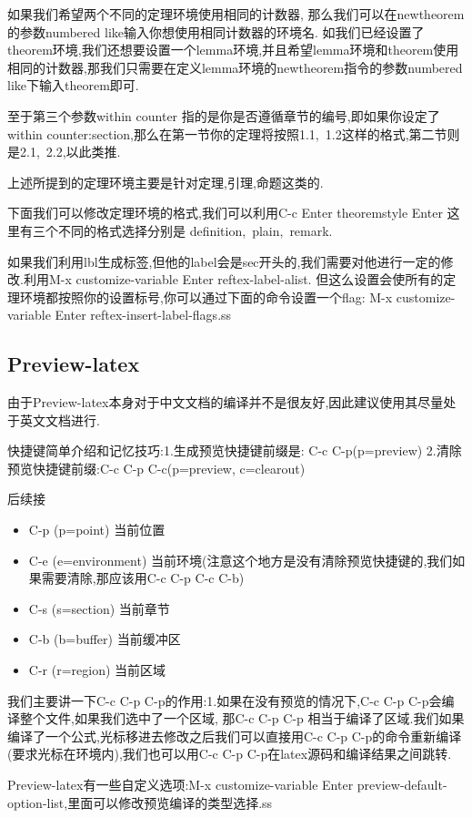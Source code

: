 \documentclass[UTF8]{ctexart}
\begin{document}
如果我们希望两个不同的定理环境使用相同的计数器, 那么我们可以在newtheorem的参数numbered like输入你想使用相同计数器的环境名. 如我们已经设置了theorem环境,我们还想要设置一个lemma环境,并且希望lemma环境和theorem使用相同的计数器,那我们只需要在定义lemma环境的newtheorem指令的参数numbered like下输入theorem即可.

至于第三个参数within counter 指的是你是否遵循章节的编号,即如果你设定了within counter:section,那么在第一节你的定理将按照1.1,\ 1.2这样的格式,第二节则是2.1,\ 2.2,以此类推.

上述所提到的定理环境主要是针对定理,引理,命题这类的.

下面我们可以修改定理环境的格式,我们可以利用C-c Enter theoremstyle Enter 这里有三个不同的格式选择分别是 definition,\ plain,\ remark.

如果我们利用lbl生成标签,但他的label会是sec开头的,我们需要对他进行一定的修改.利用M-x customize-variable Enter reftex-label-alist. 但这么设置会使所有的定理环境都按照你的设置标号,你可以通过下面的命令设置一个flag: M-x customize-variable Enter reftex-insert-label-flags.ss
\subsection{Preview-latex}
由于Preview-latex本身对于中文文档的编译并不是很友好,因此建议使用其尽量处于英文文档进行.

快捷键简单介绍和记忆技巧:1.生成预览快捷键前缀是: C-c C-p(p=preview) 2.清除预览快捷键前缀:C-c C-p C-c(p=preview, c=clearout)

后续接
\begin{itemize}
\item C-p (p=point) 当前位置 
\item C-e (e=environment) 当前环境(注意这个地方是没有清除预览快捷键的,我们如果需要清除,那应该用C-c C-p C-c C-b)
\item C-s (s=section) 当前章节
\item C-b (b=buffer) 当前缓冲区
\item C-r (r=region) 当前区域
\end{itemize}
我们主要讲一下C-c C-p C-p的作用:1.如果在没有预览的情况下,C-c C-p C-p会编译整个文件,如果我们选中了一个区域, 那C-c C-p C-p 相当于编译了区域.我们如果编译了一个公式,光标移进去修改之后我们可以直接用C-c C-p C-p的命令重新编译(要求光标在环境内),我们也可以用C-c C-p C-p在latex源码和编译结果之间跳转.

Preview-latex有一些自定义选项:M-x customize-variable Enter preview-default-option-list,里面可以修改预览编译的类型选择.ss
\end{document}
